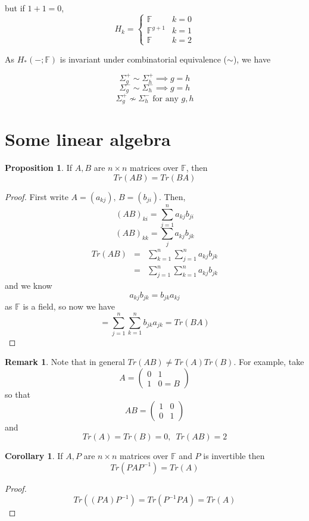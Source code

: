 \documentclass[a4paper,14pt]{extarticle}
\theoremstyle{definition}
\newtheorem*{corollary}{Corollary}
\newtheorem*{proposition}{Proposition}
\newtheorem*{remark}{Remark}
\begin{document}
\noindent but if $1+1=0$,
\[H_k=\begin{cases}
	\mathbb{F}&k=0\\
	\mathbb{F}^{g+1}&k=1\\
	\mathbb{F}&k=2
\end{cases}
\]

\noindent As $H_*(-;\mathbb{F})$ is invariant under combinatorial equivalence ($\sim$),
we have 

\[\Sigma_g^+\sim\Sigma_h^+\implies g=h\]
\[\Sigma_g^-\sim\Sigma_h^-\implies g=h\]
\[\Sigma_g^+\not\sim\Sigma_h^-\text{ for any $g,h$}\]

\section{Some linear algebra}
\begin{proposition}
	If $A,B$ are $n\times n$ matrices over $\mathbb{F}$, then 
	\[Tr(AB)=Tr(BA)\]
\end{proposition}

\begin{proof}
	First write $A=(a_{kj}), \,B=(b_{ji})$. Then,
	\[(AB)_{ki}=\sum_{j=1}^n a_{kj}b_{ji}\]\[(AB)_{kk}=\sum_j a_{kj}b_{jk}\]
	\begin{eqnarray*}
		Tr(AB)&=&\sum_{k=1}^n\sum_{j=1}^n a_{kj}b_{jk} \\
		&=&\sum_{j=1}^n\sum_{k=1}^n a_{kj}b_{jk}
	\end{eqnarray*}
	and we know \[a_{kj}b_{jk}=b_{jk}a_{kj}\] as $\mathbb{F}$ is a field, so now 
	we have 
	\[=\sum_{j=1}^n\sum_{k=1}^n b_{jk}a_{jk}=Tr(BA)\]
\end{proof}

\begin{remark}
	Note that in general $Tr(AB)\neq Tr(A)Tr(B)$. For example, take 
	\[A=\begin{pmatrix}
		0&1\\1&0=B
	\end{pmatrix}\] so that \[AB=\begin{pmatrix}
		1&0\\0&1
	\end{pmatrix}\] and \[Tr(A)=Tr(B)=0,\,\,\,Tr(AB)=2\]
\end{remark}

\begin{corollary}
	If $A,P$ are $n\times n$ matrices over $\mathbb{F}$ and $P$ is invertible then 
	\[Tr(PAP^{-1})=Tr(A)\]
\end{corollary}

\begin{proof}
	\[Tr((PA)P^{-1})=Tr(P^{-1}PA)=Tr(A)\]
\end{proof}
\end{document}
